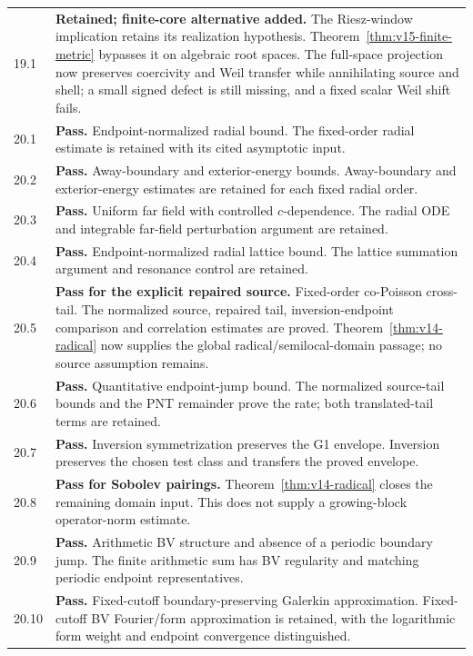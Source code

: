 \documentclass[11pt]{article}
\theoremstyle{remark}
\begin{document}
\begin{longtable}{@{}p{}p{}@{}}
19.1 & \textbf{Retained; finite-core alternative added.} The Riesz-window implication retains its realization hypothesis. Theorem~\ref{thm:v15-finite-metric} bypasses it on algebraic root spaces. The full-space projection now preserves coercivity and Weil transfer while annihilating source and shell; a small signed defect is still missing, and a fixed scalar Weil shift fails. \\[4pt]
20.1 & \textbf{Pass.} Endpoint-normalized radial bound. The fixed-order radial estimate is retained with its cited asymptotic input. \\[4pt]
20.2 & \textbf{Pass.} Away-boundary and exterior-energy bounds. Away-boundary and exterior-energy estimates are retained for each fixed radial order. \\[4pt]
20.3 & \textbf{Pass.} Uniform far field with controlled $c$-dependence. The radial ODE and integrable far-field perturbation argument are retained. \\[4pt]
20.4 & \textbf{Pass.} Endpoint-normalized radial lattice bound. The lattice summation argument and resonance control are retained. \\[4pt]
20.5 & \textbf{Pass for the explicit repaired source.} Fixed-order co-Poisson cross-tail. The normalized source, repaired tail, inversion-endpoint comparison and correlation estimates are proved. Theorem~\ref{thm:v14-radical} now supplies the global radical/semilocal-domain passage; no source assumption remains. \\[4pt]
20.6 & \textbf{Pass.} Quantitative endpoint-jump bound. The normalized source-tail bounds and the PNT remainder prove the rate; both translated-tail terms are retained. \\[4pt]
20.7 & \textbf{Pass.} Inversion symmetrization preserves the G1 envelope. Inversion preserves the chosen test class and transfers the proved envelope. \\[4pt]
20.8 & \textbf{Pass for Sobolev pairings.} Theorem~\ref{thm:v14-radical} closes the remaining domain input. This does not supply a growing-block operator-norm estimate. \\[4pt]
20.9 & \textbf{Pass.} Arithmetic BV structure and absence of a periodic boundary jump. The finite arithmetic sum has BV regularity and matching periodic endpoint representatives. \\[4pt]
20.10 & \textbf{Pass.} Fixed-cutoff boundary-preserving Galerkin approximation. Fixed-cutoff BV Fourier/form approximation is retained, with the logarithmic form weight and endpoint convergence distinguished. \\[4pt]

\end{longtable}
\end{document}

